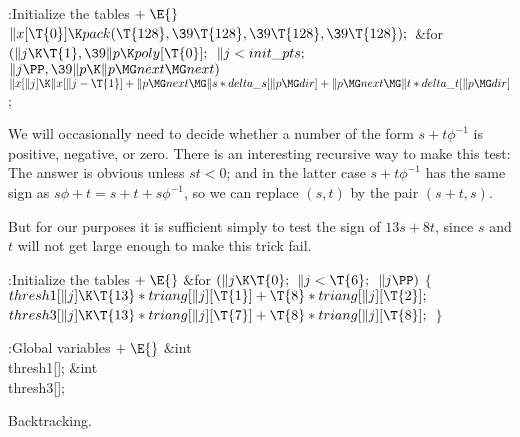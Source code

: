 \B{}:Initialize the tables\X${}\mathrel+\E{}$\6
$\|x[\T{0}]\K\\{pack}(\T{128},\39\T{128},\39\T{128},\39\T{128});{}$\6
\&{for} ${}(\|j\K\T{1},\39\|p\K\\{poly}[\T{0}];{}$ ${}\|j<\\{init\_pts};{}$ ${}%
\|j\PP,\39\|p\K\|p\MG\\{next}\MG\\{next}){}$\1\5
${}\|x[\|j]\K\|x[\|j-\T{1}]+\|p\MG\\{next}\MG\|s*\\{delta\_s}[\|p\MG\\{dir}]+%
\|p\MG\\{next}\MG\|t*\\{delta\_t}[\|p\MG\\{dir}]{}$;\2\par
\fi

We will occasionally need to decide whether a number of
the form
$s+t\phi^{-1}$ is positive, negative, or zero. There is an interesting
recursive way to make this test: The answer is obvious unless $st<0$;
and in the latter case $s+t\phi^{-1}$ has the same sign as $s\phi+t=
s+t+s\phi^{-1}$, so we can replace $(s,t)$ by the pair $(s+t,s)$.

But for our purposes it is sufficient simply to test the sign of $13s+8t$,
since $s$ and $t$ will not get large enough to make this trick fail.

\Y\B\4:Initialize the tables\X${}\mathrel+\E{}$\6
\&{for} ${}(\|j\K\T{0};{}$ ${}\|j<\T{6};{}$ ${}\|j\PP){}$\5
${}\{{}$\1\6
${}\\{thresh1}[\|j]\K\T{13}*\\{triang}[\|j][\T{1}]+\T{8}*\\{triang}[\|j][%
\T{2}];{}$\6
${}\\{thresh3}[\|j]\K\T{13}*\\{triang}[\|j][\T{7}]+\T{8}*\\{triang}[\|j][%
\T{8}];{}$\6
\4${}\}{}$\2\par
\fi

\B{}:Global variables\X${}\mathrel+\E{}$\6
\&{int} \\{thresh1}[];\6
\&{int} \\{thresh3}[];\par
\fi

Backtracking.


